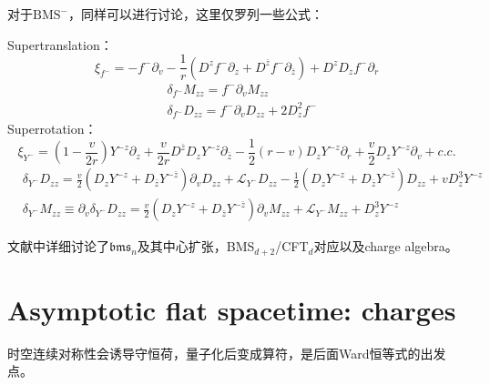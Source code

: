 对于$\text{BMS}^-$，同样可以进行讨论，这里仅罗列一些公式：

\noindent Supertranslation：
\begin{equation}
	\xi_{f^-}=-f^-\partial_v-\frac{1}{r}\left(D^zf^-\partial_z+D^{\bar z}f^-\partial_{\bar z}\right)+D^zD_zf^-\partial_r
\end{equation}
\begin{equation}
	\begin{aligned}
		&\delta_{f^-}M_{zz}=f^-\partial_v M_{zz}\\
		&\delta_{f^-}D_{zz}=f^-\partial_v D_{zz}+2D_z^2f^-
	\end{aligned}
\end{equation}
Superrotation：
\begin{equation}
	\xi_{Y^-}=\left(1-\frac{v}{2r}\right)Y^{-z}\partial_z+\frac{v}{2r}D^{\bar z}D_zY^{-z}\partial_{\bar z}-\frac{1}{2}(r-v)D_zY^{-z}\partial_r+\frac{v}{2}D_zY^{-z}\partial_v+c.c.
\end{equation}
\begin{equation}
	\begin{aligned}
		&\delta_{Y^-}D_{zz}=\frac{v}{2}\left(D_zY^{-z}+D_{\bar z}Y^{-\bar z} \right)\partial_v D_{zz}+\mathcal{L}_{Y^-}D_{zz}-\frac{1}{2}\left(D_zY^{-z}+D_{\bar z}Y^{-\bar z}\right)D_{zz}+vD^3_{z}Y^{-z}\\
		&\delta_{Y^-}M_{zz}\equiv\partial_v\delta_{Y^-}D_{zz}=\frac{v}{2}\left(D_zY^{-z}+D_{\bar z}Y^{-\bar z} \right)\partial_v M_{zz}+\mathcal{L}_{Y^-}M_{zz}+D^3_zY^{-z}
	\end{aligned}
\end{equation}

文献\cite{Barnich:2010ojg,Barnich:2010eb}中详细讨论了$\mathfrak{bms}_n$及其中心扩张，BMS$_{d+2}$/CFT$_d$对应以及charge algebra。

\section{Asymptotic flat spacetime: charges}
时空连续对称性会诱导守恒荷，量子化后变成算符，是后面Ward恒等式的出发点。
